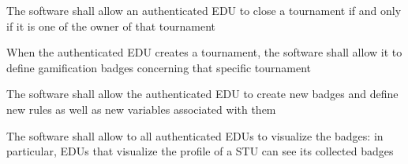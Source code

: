 \begin{requirementsenumerate}
    \item The software shall allow an authenticated EDU to close a tournament if and only if it is one of the owner of that tournament
    \item When the authenticated EDU creates a tournament, the software shall allow it to define gamification badges concerning that specific tournament
    \item The software shall allow the authenticated EDU to create new badges and define new rules as well as new variables associated with them
    \item The software shall allow to all authenticated EDUs to visualize the badges: in particular, EDUs that visualize the profile of a STU can see its collected badges
\end{requirementsenumerate}


